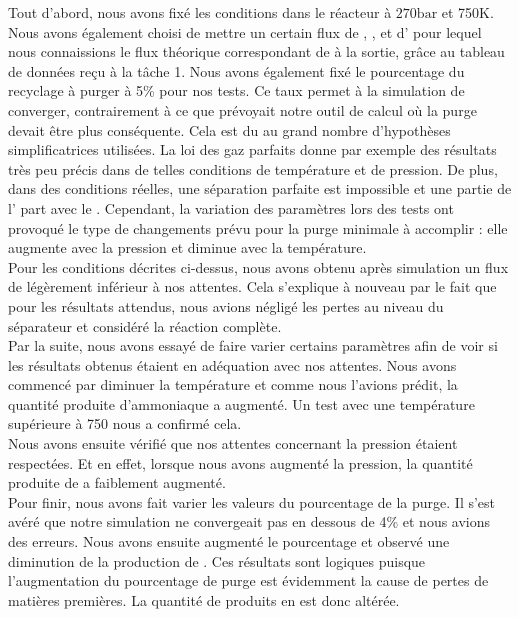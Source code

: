 \documentclass[a4paper, oneside, 12pt]{article}
\begin{document}
Tout d'abord, nous avons fixé les conditions dans le réacteur à $270\si{\bar}$ et 750K. 
Nous avons également choisi de mettre un certain flux de , , et d'  
pour lequel nous connaissions le flux théorique correspondant de  à la sortie, grâce au tableau de données reçu à la tâche 1. 
Nous avons également fixé le pourcentage du recyclage à purger à 5\% pour nos tests.
Ce taux permet à la simulation de converger, contrairement à ce que prévoyait notre outil de calcul où la purge devait être plus conséquente. 
Cela est du au grand nombre d'hypothèses simplificatrices utilisées. 
La loi des gaz parfaits donne par exemple des résultats très peu précis dans de telles conditions de température et de pression. De plus, dans des conditions réelles, une séparation parfaite est impossible et une partie de l' part avec le .
Cependant, la variation des paramètres lors des tests ont provoqué le type de changements prévu pour la purge minimale à accomplir : elle augmente avec la pression et diminue avec la température. \\
Pour les conditions décrites ci-dessus, nous avons obtenu après simulation un flux de  légèrement inférieur à nos attentes. 
Cela s'explique à nouveau par le fait que pour les résultats attendus, nous avions négligé les pertes au niveau du séparateur et considéré la réaction complète. \\
Par la suite, nous avons essayé de faire varier certains paramètres afin de voir si les résultats obtenus 
étaient en adéquation avec nos attentes. 
Nous avons commencé par diminuer la température et comme nous l'avions prédit, 
la quantité produite d'ammoniaque a augmenté. Un test avec une température supérieure à 750 nous a confirmé cela. \\
Nous avons ensuite vérifié que nos attentes concernant la pression étaient respectées. Et en effet, lorsque 
nous avons augmenté la pression, la quantité produite de  a faiblement augmenté.\\
Pour finir, nous avons fait varier les valeurs du 
pourcentage de la purge. Il s'est avéré que notre simulation ne convergeait pas en dessous de 4\% et nous avions des erreurs.
Nous avons ensuite augmenté le pourcentage et observé une diminution de la production de . Ces résultats sont logiques puisque l'augmentation du pourcentage de purge est évidemment la cause de pertes de matières premières. La quantité de produits en est donc altérée.  


\printbibliography
\end{document}
